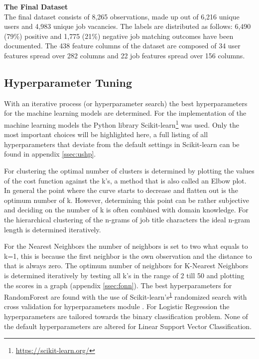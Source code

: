 \noindent
\textbf{The Final Dataset}\\
The final dataset consists of 8,265 observations, made up out of 6,216 unique users and 4,983 unique job vacancies. 
The labels are distributed as follows: 6,490 (79\%) positive and 1,775 (21\%) negative job matching outcomes have been documented. 
The 438 feature columns of the dataset are composed of 34 user features spread over 282 columns and 22 job features spread over 156 columns. 

\subsection{Hyperparameter Tuning}
\label{ssec:ht}
With an iterative process (or hyperparameter search) the best hyperparameters for the machine learning models are determined. 
For the implementation of the machine learning models the Python library Scikit-learn\footnote{\url{https://scikit-learn.org/}\label{note1}} was used.
Only the most important choices will be highlighted here, a full listing of all hyperparameters that deviate from the default settings in Scikit-learn can be found in appendix \ref{ssec:ushp}.

For clustering the optimal number of clusters is determined by plotting the values of the cost function against the k’s, a method that is also called an Elbow plot.
In general the point where the curve starts to decrease and flatten out is the optimum number of k. 
However, determining this point can be rather subjective and deciding on the number of k is often combined with domain knowledge.
For the hierarchical clustering of the n-grams of job title characters the ideal n-gram length is determined iteratively. 

For the Nearest Neighbors the number of neighbors is set to two what equals to k=1, this is because the first neighbor is the own observation and the distance to that is always zero.
The optimum number of neighbors for K-Nearest Neighbors is determined iteratively by testing all k’s in the range of 2 till 50 and plotting the scores in a graph (appendix \ref{ssec:fonn}).
The best hyperparameters for RandomForest are found with the use of Scikit-learn’s\textsuperscript{\ref{note1}} randomized search with cross validation for hyperparameters module \cite{ bergstra2012random}.
For Logistic Regression the hyperparameters are tailored towards the binary classification problem. 
None of the default hyperparameters are altered for Linear Support Vector Classification. 

